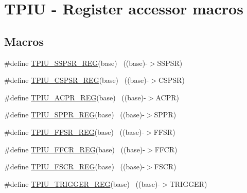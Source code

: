 \hypertarget{group___t_p_i_u___register___accessor___macros}{}\section{T\+P\+IU -\/ Register accessor macros}
\label{group___t_p_i_u___register___accessor___macros}
\subsection*{Macros}
\begin{DoxyCompactItemize}
\item 
\#define \hyperlink{group___t_p_i_u___register___accessor___macros_ga70f7b58922eb91eec6196998a950e7e6}{T\+P\+I\+U\+\_\+\+S\+S\+P\+S\+R\+\_\+\+R\+EG}(base)                                      ~((base)-\/$>$S\+S\+P\+SR)
\item 
\#define \hyperlink{group___t_p_i_u___register___accessor___macros_gafea47d54b3ce624f0b487095a33f87ee}{T\+P\+I\+U\+\_\+\+C\+S\+P\+S\+R\+\_\+\+R\+EG}(base)                                      ~((base)-\/$>$C\+S\+P\+SR)
\item 
\#define \hyperlink{group___t_p_i_u___register___accessor___macros_gaa1533cc1963e2e41268410ac18591036}{T\+P\+I\+U\+\_\+\+A\+C\+P\+R\+\_\+\+R\+EG}(base)                                        ~((base)-\/$>$A\+C\+PR)
\item 
\#define \hyperlink{group___t_p_i_u___register___accessor___macros_ga0999ff94c91a95cc02e2bbd25f41f2b4}{T\+P\+I\+U\+\_\+\+S\+P\+P\+R\+\_\+\+R\+EG}(base)                                        ~((base)-\/$>$S\+P\+PR)
\item 
\#define \hyperlink{group___t_p_i_u___register___accessor___macros_ga87fa1043a4397fabb81e4be255c0a6d2}{T\+P\+I\+U\+\_\+\+F\+F\+S\+R\+\_\+\+R\+EG}(base)                                        ~((base)-\/$>$F\+F\+SR)
\item 
\#define \hyperlink{group___t_p_i_u___register___accessor___macros_ga890150a55f047ae7b0e424fb1ab69c62}{T\+P\+I\+U\+\_\+\+F\+F\+C\+R\+\_\+\+R\+EG}(base)                                        ~((base)-\/$>$F\+F\+CR)
\item 
\#define \hyperlink{group___t_p_i_u___register___accessor___macros_ga9502e583218f28d70aed3da35b51fa9c}{T\+P\+I\+U\+\_\+\+F\+S\+C\+R\+\_\+\+R\+EG}(base)                                        ~((base)-\/$>$F\+S\+CR)
\item 
\#define \hyperlink{group___t_p_i_u___register___accessor___macros_gae0e1f67cdfd71a79d152c901cb744a34}{T\+P\+I\+U\+\_\+\+T\+R\+I\+G\+G\+E\+R\+\_\+\+R\+EG}(base)                                  ~((base)-\/$>$T\+R\+I\+G\+G\+ER)

\end{DoxyCompactItemize}
